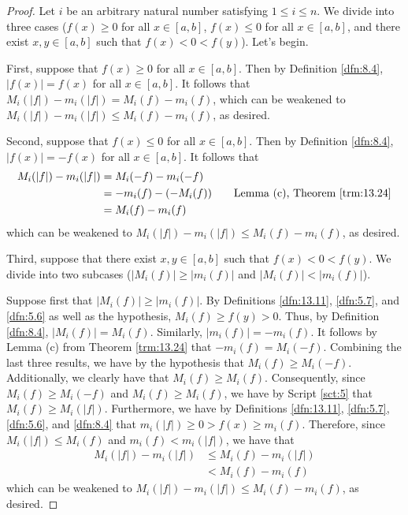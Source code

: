 \documentclass[../main.tex]{subfiles}
\begin{document}
\begin{theorem}
\begin{lemma*}
\begin{proof}
            Let $i$ be an arbitrary natural number satisfying $1\leq i\leq n$. We divide into three cases ($f(x)\geq 0$ for all $x\in[a,b]$, $f(x)\leq 0$ for all $x\in[a,b]$, and there exist $x,y\in[a,b]$ such that $f(x)<0<f(y)$). Let's begin.\par\smallskip
            First, suppose that $f(x)\geq 0$ for all $x\in[a,b]$. Then by Definition \ref{dfn:8.4}, $|f(x)|=f(x)$ for all $x\in[a,b]$. It follows that $M_i(|f|)-m_i(|f|)=M_i(f)-m_i(f)$, which can be weakened to $M_i(|f|)-m_i(|f|)\leq M_i(f)-m_i(f)$, as desired.\par\smallskip
            Second, suppose that $f(x)\leq 0$ for all $x\in[a,b]$. Then by Definition \ref{dfn:8.4}, $|f(x)|=-f(x)$ for all $x\in[a,b]$. It follows that
            \begin{align*}
                M_i(|f|)-m_i(|f|) &= M_i(-f)-m_i(-f)\\
                &= -m_i(f)-(-M_i(f))\tag*{Lemma (c), Theorem \ref{trm:13.24}}\\
                &= M_i(f)-m_i(f)
            \end{align*}
            which can be weakened to $M_i(|f|)-m_i(|f|)\leq M_i(f)-m_i(f)$, as desired.\par\smallskip
            Third, suppose that there exist $x,y\in[a,b]$ such that $f(x)<0<f(y)$. We divide into two subcases ($|M_i(f)|\geq|m_i(f)|$ and $|M_i(f)|<|m_i(f)|$).\par
            Suppose first that $|M_i(f)|\geq|m_i(f)|$. By Definitions \ref{dfn:13.11}, \ref{dfn:5.7}, and \ref{dfn:5.6} as well as the hypothesis, $M_i(f)\geq f(y)>0$. Thus, by Definition \ref{dfn:8.4}, $|M_i(f)|=M_i(f)$. Similarly, $|m_i(f)|=-m_i(f)$. It follows by Lemma (c) from Theorem \ref{trm:13.24} that $-m_i(f)=M_i(-f)$. Combining the last three results, we have by the hypothesis that $M_i(f)\geq M_i(-f)$. Additionally, we clearly have that $M_i(f)\geq M_i(f)$. Consequently, since $M_i(f)\geq M_i(-f)$ and $M_i(f)\geq M_i(f)$, we have by Script \ref{sct:5} that $M_i(f)\geq M_i(|f|)$. Furthermore, we have by Definitions \ref{dfn:13.11}, \ref{dfn:5.7}, \ref{dfn:5.6}, and \ref{dfn:8.4} that $m_i(|f|)\geq 0>f(x)\geq m_i(f)$. Therefore, since $M_i(|f|)\leq M_i(f)$ and $m_i(f)<m_i(|f|)$, we have that
            \begin{align*}
                M_i(|f|)-m_i(|f|) &\leq M_i(f)-m_i(|f|)\\
                &< M_i(f)-m_i(f)
            \end{align*}
            which can be weakened to $M_i(|f|)-m_i(|f|)\leq M_i(f)-m_i(f)$, as desired.\par

\end{proof}
\end{lemma*}
\end{theorem}
\end{document}
